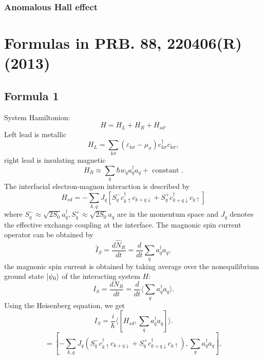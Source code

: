 \documentclass[11pt,a4paper]{book}
\begin{document}
\subsubsection{Anomalous Hall effect}
\section{Formulas in PRB. 88, 220406(R) (2013)}
\subsection{Formula 1}
System Hamiltonion:
\begin{equation}
H=H_{L}+H_{R}+H_{s d}.
\end{equation}
Left lead is metallic
\begin{equation}
H_{L} = \sum_{k\sigma} \left(\varepsilon_{k\sigma}-\mu_{\sigma}\right) c_{k \sigma}^{\dagger} c_{k \sigma},
\end{equation}
right lead is insulating magnetic
\begin{equation}
H_{R} \approx \sum_{q} \hbar w_{q} a_{q}^{\dagger} a_{q}+\text { constant }.
\end{equation}
The interfacial electron-magnon interaction is described by
\begin{equation}
H_{s d}=-\sum_{k, q} J_{q}\left[S_{q}^{-} c_{k \uparrow}^{\dagger} c_{k+q \downarrow}+S_{q}^{+} c_{k+q \downarrow}^{\dagger} c_{k \uparrow}\right]
\end{equation}
where $S_{q}^{-} \approx \sqrt{2 S_{0}} a_{q}^{\dagger}, S_{q}^{+} \approx \sqrt{2 S_{0}} a_{q}$ are in the momentum space and $J_{q}$ denotes the effective exchange coupling at the interface. The magnonic spin current operator can be obtained by
\begin{equation}
\hat{I}_{S} = \frac{d\hat{N}_{R}}{dt} =  \frac{d}{dt} \sum_{q}a_{q}^{\dag}a_{q},
\end{equation}
the magnonic spin current is obtained by taking average over the nonequilibrium ground state $\ket{\psi_{0}}$ of the interacting system $H$:
\begin{equation}
I_{S} = \frac{dN_{R}}{dt} =  \frac{d}{dt} \langle \sum_{q}a_{q}^{\dag}a_{q}\rangle.
\end{equation}
Using the Heisenberg equation, we get
\begin{equation}
I_{S}=\frac{i}{\hbar}\langle[H_{s d}, \sum_{q} a_{q}^{\dagger} a_{q}]\rangle.
\end{equation}
\begin{equation}
[H_{s d}, \sum_{q} a_{q}^{\dagger} a_{q}] = [-\sum_{k, q} J_{q}\left(S_{q}^{-} c_{k \uparrow}^{\dagger} c_{k+q \downarrow}+S_{q}^{+} c_{k+q \downarrow}^{\dagger} c_{k \uparrow}\right), \sum_{q} a_{q}^{\dagger} a_{q}],
\end{equation}
\end{document}
